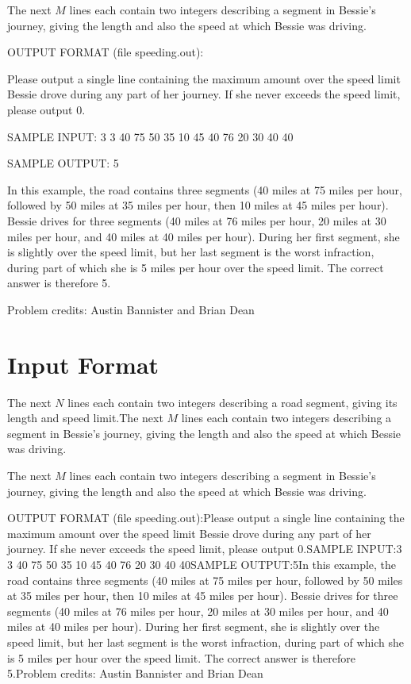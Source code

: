 \documentclass[12pt]{article}
\begin{document}
The next $M$ lines each contain two integers describing a segment
in Bessie's journey, giving the length and also the speed at which
Bessie was driving.


OUTPUT FORMAT (file speeding.out):

Please output a single line containing the maximum amount over the speed limit
Bessie drove during any part of her journey.  If she never exceeds the speed
limit, please output 0.


SAMPLE INPUT:
3 3
40 75
50 35
10 45
40 76
20 30
40 40

SAMPLE OUTPUT: 
5

In this example, the road contains three segments (40 miles at 75
miles per hour, followed by 50 miles at 35 miles per hour, then 10
miles at 45 miles per hour).  Bessie drives for three segments (40
miles at 76 miles per hour, 20 miles at 30 miles per hour, and 40
miles at 40 miles per hour).  During her first segment, she is
slightly over the speed limit, but her last segment is the worst
infraction, during part of which she is 5 miles per hour over the
speed limit.  The correct answer is therefore 5.

Problem credits: Austin Bannister and Brian Dean



\section*{Input Format}
The next $N$ lines each contain two integers describing a road segment, giving
its length and speed limit.The next $M$ lines each contain two integers describing a segment
in Bessie's journey, giving the length and also the speed at which
Bessie was driving.

The next $M$ lines each contain two integers describing a segment
in Bessie's journey, giving the length and also the speed at which
Bessie was driving.

OUTPUT FORMAT (file speeding.out):Please output a single line containing the maximum amount over the speed limit
Bessie drove during any part of her journey.  If she never exceeds the speed
limit, please output 0.SAMPLE INPUT:3 3
40 75
50 35
10 45
40 76
20 30
40 40SAMPLE OUTPUT:5In this example, the road contains three segments (40 miles at 75
miles per hour, followed by 50 miles at 35 miles per hour, then 10
miles at 45 miles per hour).  Bessie drives for three segments (40
miles at 76 miles per hour, 20 miles at 30 miles per hour, and 40
miles at 40 miles per hour).  During her first segment, she is
slightly over the speed limit, but her last segment is the worst
infraction, during part of which she is 5 miles per hour over the
speed limit.  The correct answer is therefore 5.Problem credits: Austin Bannister and Brian Dean
\end{document}
